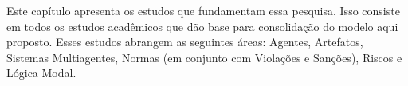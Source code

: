 Este capítulo apresenta os estudos que fundamentam essa pesquisa. Isso consiste em todos os estudos acadêmicos que dão base para consolidação do modelo aqui proposto. Esses estudos abrangem as seguintes áreas: Agentes, Artefatos, Sistemas Multiagentes, Normas (em conjunto com Violações e Sanções), Riscos e Lógica Modal. 